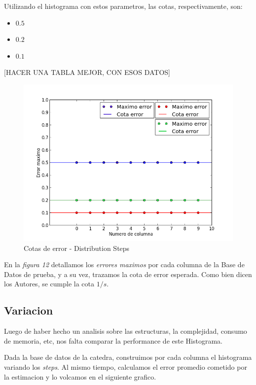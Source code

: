 \documentclass[10pt, a4paper,english,spanish,hidelinks]{article}
\begin{document}
Utilizando el histograma con estos parametros, las cotas, respectivamente, son:

\begin{itemize}
\item $0.5$
\item $0.2$
\item $0.1$
\end{itemize}

[HACER UNA TABLA MEJOR, CON ESOS DATOS] 

\begin{figure}
  \centering
  \includegraphics[scale=0.6]{./imagenes/ejc2_cota_juntos.png}
  \caption{Cotas de error - Distribution Steps}
\end{figure}

En la \textit{figura 12} detallamos los \textit{errores maximos} por cada columna de la Base de Datos de prueba, y a su vez, trazamos la cota de error esperada.
Como bien dicen los Autores, se cumple la cota $1/s$.


\subsection{Variacion}

Luego de haber hecho un analisis sobre las estructuras, la complejidad, consumo de memoria, etc, nos falta comparar la performance de este Histograma.

Dada la base de datos de la catedra, construimos por cada columna el histograma variando los \textit{steps}. Al mismo tiempo, calculamos el error promedio cometido por la estimacion y lo volcamos en el siguiente grafico.
\end{document}
